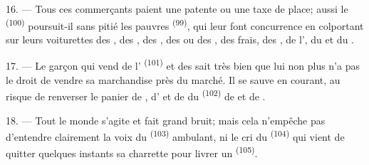 16. --- Tous ces commerçants paient une patente ou une taxe de place; aussi le
 \textsuperscript{(100)} poursuit-il sans pitié les pauvres
 \textsuperscript{(99)}, qui leur font
concurrence en colportant sur leurs voiturettes des , des
, des , des  ou des , des  frais, des , de
l', du  et du .

\VUsaut{4.0mm}
\VUsaut{3.0mm}

17. --- Le garçon qui vend de l' \textsuperscript{(101)} et des
 sait très bien que lui non plus n'a pas le droit de vendre sa
marchandise près du marché. Il se sauve en courant, au risque de renverser le
panier de , d' et de  du
 \textsuperscript{(102)} de  et de
.

18. --- Tout le monde s'agite et fait grand bruit; mais cela n'empêche pas
d'entendre clairement la voix du  \textsuperscript{(103)}
ambulant, ni le cri du  \textsuperscript{(104)} qui vient de
quitter quelques instants sa charrette pour livrer un 
\textsuperscript{(105)}.
\VUsaut{6.0mm}
\VUfilet{22mm}
